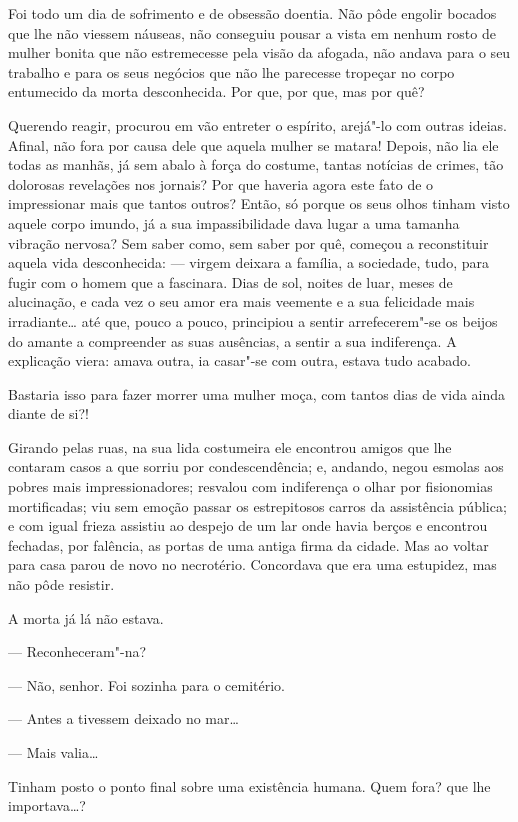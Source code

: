 Foi todo um dia de sofrimento e de obsessão doentia. Não pôde engolir
bocados que lhe não viessem náuseas, não conseguiu pousar a vista em
nenhum rosto de mulher bonita que não estremecesse pela visão da
afogada, não andava para o seu trabalho e para os seus negócios que não
lhe parecesse tropeçar no corpo entumecido da morta desconhecida. Por
que, por que, mas por quê?

Querendo reagir, procurou em vão entreter o espírito, arejá"-lo com
outras ideias. Afinal, não fora por causa dele que aquela mulher se
matara! Depois, não lia ele todas as manhãs, já sem abalo à força do
costume, tantas notícias de crimes, tão dolorosas revelações nos
jornais? Por que haveria agora este fato de o impressionar mais que
tantos outros? Então, só porque os seus olhos tinham visto aquele corpo
imundo, já a sua impassibilidade dava lugar a uma tamanha vibração
nervosa? Sem saber como, sem saber por quê, começou a reconstituir
aquela vida desconhecida: --- virgem deixara a família, a sociedade,
tudo, para fugir com o homem que a fascinara. Dias de sol, noites de
luar, meses de alucinação, e cada vez o seu amor era mais veemente e a
sua felicidade mais irradiante\ldots{} até que, pouco a pouco, principiou a
sentir arrefecerem"-se os beijos do amante a compreender as suas
ausências, a sentir a sua indiferença. A explicação viera: amava outra,
ia casar"-se com outra, estava tudo acabado.

Bastaria isso para fazer morrer uma mulher moça, com tantos dias de vida
ainda diante de si?!

Girando pelas ruas, na sua lida costumeira ele encontrou amigos que lhe
contaram casos a que sorriu por condescendência; e, andando, negou
esmolas aos pobres mais impressionadores; resvalou com indiferença o
olhar por fisionomias mortificadas; viu sem emoção passar os
estrepitosos carros da assistência pública; e com igual frieza assistiu
ao despejo de um lar onde havia berços e encontrou fechadas, por
falência, as portas de uma antiga firma da cidade. Mas ao voltar para
casa parou de novo no necrotério. Concordava que era uma estupidez, mas
não pôde resistir.

A morta já lá não estava.

--- Reconheceram"-na?

--- Não, senhor. Foi sozinha para o cemitério.

--- Antes a tivessem deixado no mar\ldots{}

--- Mais valia\ldots{}

Tinham posto o ponto final sobre uma existência humana. Quem fora? que
lhe importava\ldots{}?

